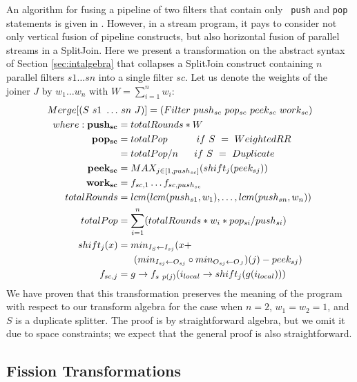An algorithm for fusing a pipeline of two filters that contain only {\tt
push} and {\tt pop} statements is given in \cite{pro96}.  However, in a
stream program, it pays to consider not only vertical fusion of pipeline
constructs, but also horizontal fusion of parallel streams in a
SplitJoin.  Here we present a transformation on the abstract syntax of
Section \ref{sec:intalgebra} that collapses a SplitJoin construct
containing $n$ parallel filters $s1 \dots sn$ into a single filter $sc$.
Let us denote the weights of the joiner $J$ by $w_1 \dots w_n$ with $W =
\sum_{i=1}^{n}{w_i}$:
\begin{align*}
Merge[(S~s1~\dots&~sn~J)] = (Filter~push_{sc}~pop_{sc}~peek_{sc}~work_{sc}) \\
where: {\bf push_{sc}} &= totalRounds * W \\
       {\bf pop_{sc}} &= totalPop ~~~~~~~~~if~S~=~WeightedRR \\
                &= totalPop / n ~~~~~if~S~=~Duplicate \\
       {\bf peek_{sc}} &= MAX_{j \in [1,push_{sc}]}(shift_j(peek_{sj})) \\
       {\bf work_{sc}} &= f_{sc, 1} \dots f_{sc, push_{sc}} \\
       totalRounds &= lcm(lcm(push_{s1}, w_1), \dots, lcm(push_{sn},
       w_n)) \\
       totalPop &= \sum_{i=1}^{n}(totalRounds * w_i * pop_{si} / push_{si}) \\
       shift_j(x) &= min_{I_S \leftarrow I_{sj}}(x + \\ &~~~~~(min_{I_{sj} \leftarrow O_{sj}} \circ min_{O_{sj} \leftarrow O_J})(j)-peek_{sj}) \\
       f_{sc, j} &= g \rightarrow f_{s~p(j)}(i_{local} \rightarrow shift_j(g(i_{local})))
\end{align*}
We have proven that this transformation preserves the meaning of the
program with respect to our transform algebra for the case when $n = 2$,
$w_1 = w_2 = 1$, and $S$ is a duplicate splitter.  The proof is by
straightforward algebra, but we omit it due to space constraints; we
expect that the general proof is also straightforward.

\subsection{Fission Transformations}

